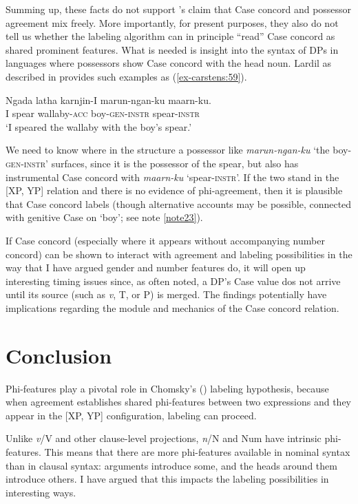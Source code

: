 \documentclass[output=paper
,modfonts
,nonflat]{langsci/langscibook}
\begin{document}
Summing up, these facts do not support \citeauthor{Norris2014}'s claim that Case concord and possessor agreement mix freely. More importantly, for present purposes, they also do not tell us whether the labeling algorithm can in principle ``read'' Case concord as shared prominent features. What is needed is insight into the syntax of DPs in languages where possessors show Case concord with the head noun. Lardil as described in \citet{Richards2007} provides such examples as (\ref{ex-carstens:59}).

\begin{exe}
\ex \label{ex-carstens:59}
\gll Ngada latha   karnjin-I       marun-ngan-ku   maarn-ku.\\
I    spear  wallaby-\textsc{acc} boy-\textsc{gen-instr}    spear-\textsc{instr}\\
\glt `I speared the wallaby with the boy's spear.'
\end{exe}
We need to know where in the structure a possessor like \textit{marun-ngan-ku} `the boy-\textsc{gen-instr}' surfaces, since it is the possessor of the spear, but also has instrumental Case concord with \textit{maarn-ku} `spear-\textsc{instr}'. If the two stand in the [XP, YP] relation and there is no evidence of phi-agreement, then it is plausible that Case concord labels (though alternative accounts may be possible, connected with genitive Case on `boy'; see note \ref{note23}).

If Case concord (especially where it appears without accompanying number concord) can be shown to interact with agreement and labeling possibilities in the way that I have argued gender and number features do, it will open up interesting timing issues since, as often noted, a DP’s Case value dos not arrive until its source (such as \textit{v}, T, or P) is merged. The findings potentially have implications regarding the module and mechanics of the Case concord relation.  

\section{Conclusion} \label{sec-carstens:8}

Phi-features play a pivotal role in Chomsky's (\citeyear{Chomsky2013, Chomsky2015}) labeling hypothesis, because when agreement establishes shared phi-features between two expressions and they appear in the [XP, YP] configuration, labeling can proceed. 

Unlike \textit{v}/V and other clause-level projections, \textit{n}/N and Num have intrinsic phi-features. This means that there are more phi-features available in nominal syntax than in clausal syntax: arguments introduce some, and the heads around them introduce others. I have argued that this impacts the labeling possibilities in interesting ways.
\end{document}
